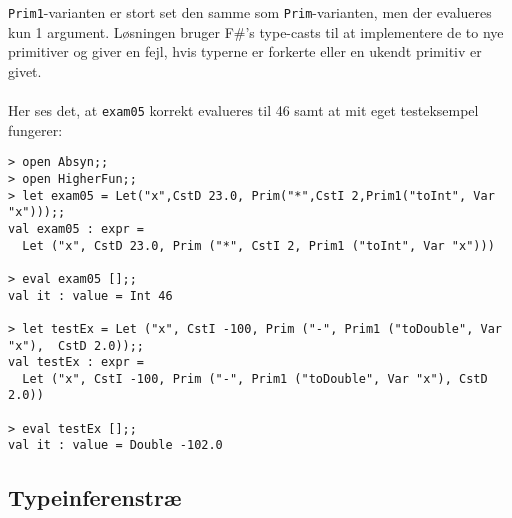 \texttt{Prim1}-varianten er stort set den samme som \texttt{Prim}-varianten, men der evalueres kun 1 argument. Løsningen bruger F\#'s type-casts til at implementere de to nye primitiver og giver en fejl, hvis typerne er forkerte eller en ukendt primitiv er givet.
\\\\
Her ses det, at \texttt{exam05} korrekt evalueres til 46 samt at mit eget testeksempel fungerer:

\begin{verbatim}
> open Absyn;;
> open HigherFun;;
> let exam05 = Let("x",CstD 23.0, Prim("*",CstI 2,Prim1("toInt", Var "x")));;
val exam05 : expr =
  Let ("x", CstD 23.0, Prim ("*", CstI 2, Prim1 ("toInt", Var "x")))

> eval exam05 [];;
val it : value = Int 46

> let testEx = Let ("x", CstI -100, Prim ("-", Prim1 ("toDouble", Var "x"),  CstD 2.0));;
val testEx : expr =
  Let ("x", CstI -100, Prim ("-", Prim1 ("toDouble", Var "x"), CstD 2.0))

> eval testEx [];;
val it : value = Double -102.0
\end{verbatim}

\subsection{Typeinferenstræ}

\begin{figure}[H]
    \hbox{}
\end{figure}
